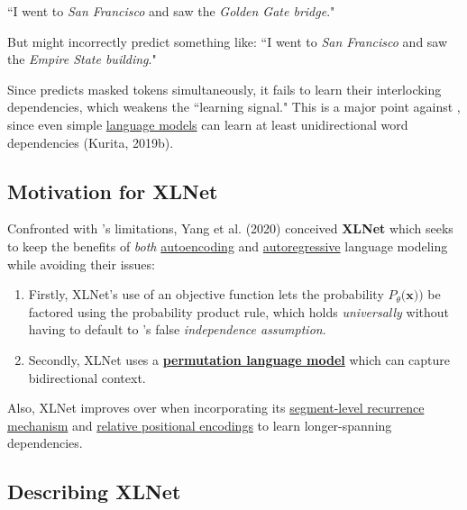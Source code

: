 ``I went to \emph{San Francisco} and saw the \emph{Golden Gate bridge}."

But  might incorrectly predict something like: ``I went to \emph{San Francisco} and saw the \emph{Empire State building}." 

Since  predicts masked tokens simultaneously, it fails to learn their interlocking dependencies, which weakens the ``learning signal." This is a major point against , since even simple \hyperref[sec:LanguageModels]{language models} can learn at least unidirectional word dependencies (Kurita, 2019b). 



\subsection{Motivation for XLNet}

Confronted with 's limitations, Yang et al. (2020) conceived \textbf{XLNet} which seeks to keep the benefits of \emph{both} \hyperref[sec:autoencodingLM]{autoencoding} and \hyperref[sec:autoregressiveLM]{autoregressive} language modeling while avoiding their issues: 

\begin{enumerate}
    \item Firstly, XLNet's use of an  objective function lets the probability $P_\theta(\textbf{x))}$ be factored using the probability product rule, which holds \emph{universally} without having to default to 's false \emph{independence assumption}. 
    
    \item  Secondly, XLNet uses a \textbf{\hyperref[sec:permutationLM]{permutation language model}} which can capture bidirectional context. 
    
\end{enumerate}




Also, XLNet improves over  when incorporating its \hyperref[sec:SegmentLevelRec]{segment-level recurrence mechanism} and \hyperref[sec:RelativePosEnc]{relative positional encodings} to learn longer-spanning dependencies. 

\subsection{Describing XLNet}


